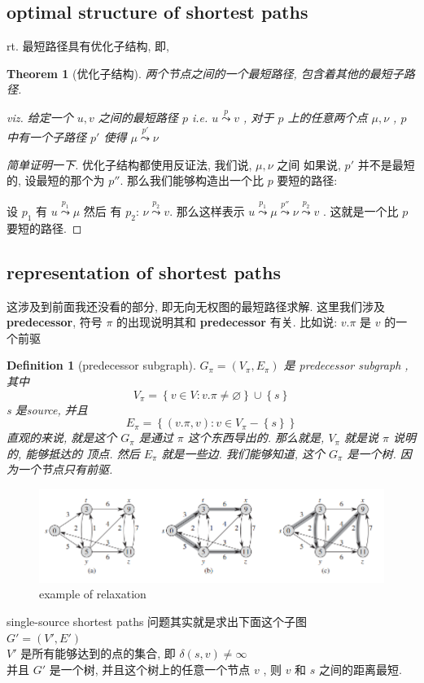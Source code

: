 \documentclass[a4paper, 10pt]{ctexart} %
\newtheorem{theorem}{Theorem}
\newtheorem{definition}{Definition}
\begin{document}
\subsection{optimal structure of shortest paths}
rt. 最短路径具有优化子结构, 即, 
\begin{theorem}[优化子结构]
    两个节点之间的一个最短路径, 包含着其他的最短子路径. 

    viz. 
    给定一个 $u,v$ 之间的最短路径 $p$ 
    i.e. $u \overset{p}{\leadsto}v$ ,
    对于 $p$ 上的任意两个点 $\mu ,\nu$
    , $p$ 中有一个子路径 $p'$ 使得 
    $ \mu \overset{p'}{\leadsto} \nu$
\end{theorem}
\begin{proof}[简单证明一下]
优化子结构都使用反证法, 我们说, $ \mu , \nu$ 之间
如果说, $p'$ 并不是最短的, 设最短的那个为 $p''$.
那么我们能够构造出一个比 $p$ 要短的路径:

设 $p_{1}$ 有 $u \overset{p_{1}}{\leadsto} \mu$ 然后 有 $p_{2}$: 
$\nu  \overset{p_{2}}{\leadsto} v$.
那么这样表示 $u \overset{p_{1}}{\leadsto} \mu \overset{p''}{\leadsto} \nu \overset{p_{2}}{\leadsto} v$ .
这就是一个比 $p$ 要短的路径.
\end{proof}
\subsection{representation of shortest paths} 
这涉及到前面我还没看的部分, 即无向无权图的最短路径求解. 这里我们涉及 \textbf{predecessor}, 符号 $\pi  $ 的出现说明其和 \textbf{predecessor} 有关. 比如说: 
$v. \pi$ 是 $v$ 的一个前驱
\begin{definition}[predecessor subgraph]
$G_{\pi} = \left(V_{\pi  } , E_{\pi}\right)$ 是 predecessor subgraph , 其中 
$$V_{\pi} = \left\{v \in V : v.\pi \ne \varnothing\right\}\cup \left\{s\right\}$$ 
s 是source, 
并且
$$E _{\pi   } = \left\{ \left(v.\pi , v\right):v \in V_{\pi} - \left\{s\right\} \right\}$$
直观的来说, 就是这个 $G_{\pi}$ 是通过 $\pi$ 这个东西导出的. 那么就是, $V_{\pi}$ 就是说 $\pi$ 说明的, 能够抵达的
顶点. 然后 $E_{\pi}$ 就是一些边. 我们能够知道, 这个 $G_{\pi }$ 是一个树. 因为一个节点只有前驱. 
\end{definition}
\begin{figure}
    \centering
    \includegraphics[scale = 0.5]{sssp4.png}
    \caption{example of relaxation}
    \label{fig:relaxation}
\end{figure}
\noindent single-source shortest paths 问题其实就是求出下面这个子图 
\\ $G'  = \left(V '  , E'\right)$ \\ $V'$ 是所有能够达到的点的集合, 即 $\delta \left(s , v\right) \ne \infty$
\\ 并且 $G'$ 是一个树, 并且这个树上的任意一个节点 $v$ , 则 $v$ 和 $s$ 之间的距离最短. 
\end{document}
